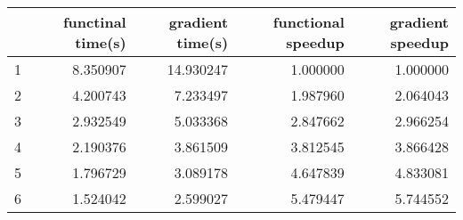 \begin{tabular}{lrrrr}
\toprule
{} &  functinal time(s) &  gradient time(s) &  functional speedup &  gradient speedup \\
\midrule
1 &           8.350907 &         14.930247 &            1.000000 &          1.000000 \\
2 &           4.200743 &          7.233497 &            1.987960 &          2.064043 \\
3 &           2.932549 &          5.033368 &            2.847662 &          2.966254 \\
4 &           2.190376 &          3.861509 &            3.812545 &          3.866428 \\
5 &           1.796729 &          3.089178 &            4.647839 &          4.833081 \\
6 &           1.524042 &          2.599027 &            5.479447 &          5.744552 \\
\bottomrule
\end{tabular}
